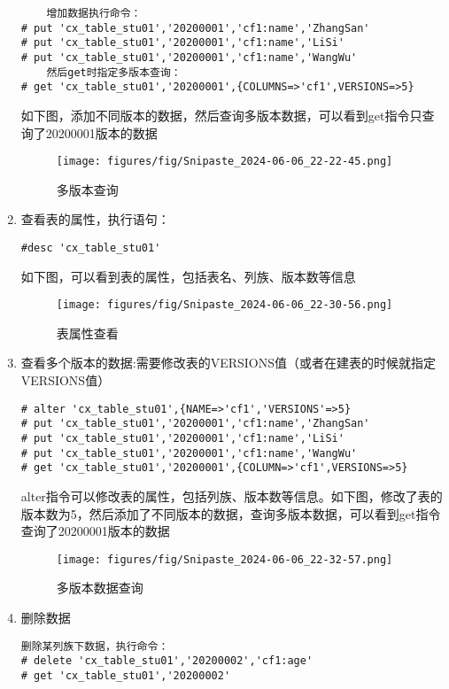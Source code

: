 \documentclass[12pt,hyperref,a4paper,UTF8]{ctexart}
\begin{document}
\begin{enumerate}
    \begin{verbatim}
    增加数据执行命令：
# put 'cx_table_stu01','20200001','cf1:name','ZhangSan'
# put 'cx_table_stu01','20200001','cf1:name','LiSi'
# put 'cx_table_stu01','20200001','cf1:name','WangWu'
    然后get时指定多版本查询：
# get 'cx_table_stu01','20200001',{COLUMNS=>'cf1',VERSIONS=>5}
    \end{verbatim}      
    如下图，添加不同版本的数据，然后查询多版本数据，可以看到get指令只查询了20200001版本的数据 
    \begin{figure}[H]
        \centering
        \texttt{[image: figures/fig/Snipaste\_2024-06-06\_22-22-45.png]}
        \caption{多版本查询}
        \label{fig:8}
    \end{figure}    
    \item 查看表的属性，执行语句：
    \begin{verbatim}
#desc 'cx_table_stu01'
    \end{verbatim}       
    如下图，可以看到表的属性，包括表名、列族、版本数等信息
    \begin{figure}[H]
        \centering
        \texttt{[image: figures/fig/Snipaste\_2024-06-06\_22-30-56.png]}
        \caption{表属性查看}
        \label{fig:8}
    \end{figure} 

    \item 查看多个版本的数据:需要修改表的VERSIONS值（或者在建表的时候就指定VERSIONS值）
    \begin{verbatim}
# alter 'cx_table_stu01',{NAME=>'cf1','VERSIONS'=>5}
# put 'cx_table_stu01','20200001','cf1:name','ZhangSan' 
# put 'cx_table_stu01','20200001','cf1:name','LiSi'
# put 'cx_table_stu01','20200001','cf1:name','WangWu'
# get 'cx_table_stu01','20200001',{COLUMN=>'cf1',VERSIONS=>5}
    \end{verbatim}  
    alter指令可以修改表的属性，包括列族、版本数等信息。如下图，修改了表的版本数为5，然后添加了不同版本的数据，查询多版本数据，可以看到get指令查询了20200001版本的数据
    \begin{figure}[H]
        \centering
        \texttt{[image: figures/fig/Snipaste\_2024-06-06\_22-32-57.png]}
        \caption{多版本数据查询}
        \label{fig:8}
    \end{figure} 
    
    
    \item 删除数据
    \begin{verbatim}
删除某列族下数据，执行命令：
# delete 'cx_table_stu01','20200002','cf1:age'
# get 'cx_table_stu01','20200002'
 

\end{verbatim}
\end{enumerate}
\end{document}
